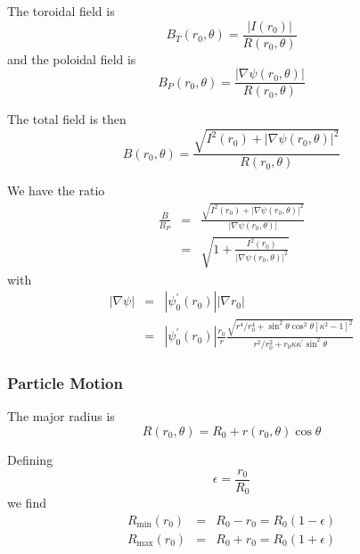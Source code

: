 \documentclass{article}
\begin{document}
The toroidal field is 
\begin{equation}
B_{T}\left( r_{0},\theta \right) =\frac{\left| I\left( r_{0}\right) \right| 
}{R\left( r_{0},\theta \right) }
\end{equation}
and the poloidal field is 
\begin{equation}
B_{P}\left( r_{0},\theta \right) =\frac{\left| \nabla \psi \left(
r_{0},\theta \right) \right| }{R\left( r_{0},\theta \right) }
\end{equation}

The total field is then 
\begin{equation}
B\left( r_{0},\theta \right) =\frac{\sqrt{I^{2}\left( r_{0}\right) +\left|
\nabla \psi \left( r_{0},\theta \right) \right| ^{2}}}{R\left( r_{0},\theta
\right) }
\end{equation}

We have the ratio 
\begin{eqnarray}
\frac{B}{B_{P}} &=&\frac{\sqrt{I^{2}\left( r_{0}\right) +\left| \nabla \psi
\left( r_{0},\theta \right) \right| ^{2}}}{\left| \nabla \psi \left(
r_{0},\theta \right) \right| } \\
&=&\sqrt{1+\frac{I^{2}\left( r_{0}\right) }{\left| \nabla \psi \left(
r_{0},\theta \right) \right| ^{2}}}
\end{eqnarray}
with
\begin{eqnarray}
\left| \nabla \psi \right|  &=&\left| \psi _{0}^{\prime }\left( r_{0}\right)
\right| \left| \nabla r_{0}\right|  \\
&=&\left| \psi _{0}^{\prime }\left( r_{0}\right) \right| \frac{r_{0}}{r}%
\frac{\sqrt{r^{4}/r_{0}^{4}+\sin ^{2}\theta \cos ^{2}\theta \left[ \kappa
^{2}-1\right] ^{2}}}{r^{2}/r_{0}^{2}+r_{0}\kappa \kappa ^{\prime }\sin
^{2}\theta }
\end{eqnarray}

\subsubsection{Particle Motion}

The major radius is
\begin{equation}
R\left( r_{0},\theta \right) =R_{0}+r\left( r_{0},\theta \right) \cos \theta 
\end{equation}

Defining 
\begin{equation}
\epsilon =\frac{r_{0}}{R_{0}}
\end{equation}
we find 
\begin{eqnarray}
R_{\min }\left( r_{0}\right)  &=&R_{0}-r_{0}=R_{0}\left( 1-\epsilon \right) 
\\
R_{\max }\left( r_{0}\right)  &=&R_{0}+r_{0}=R_{0}\left( 1+\epsilon \right) 
\end{eqnarray}
\end{document}

